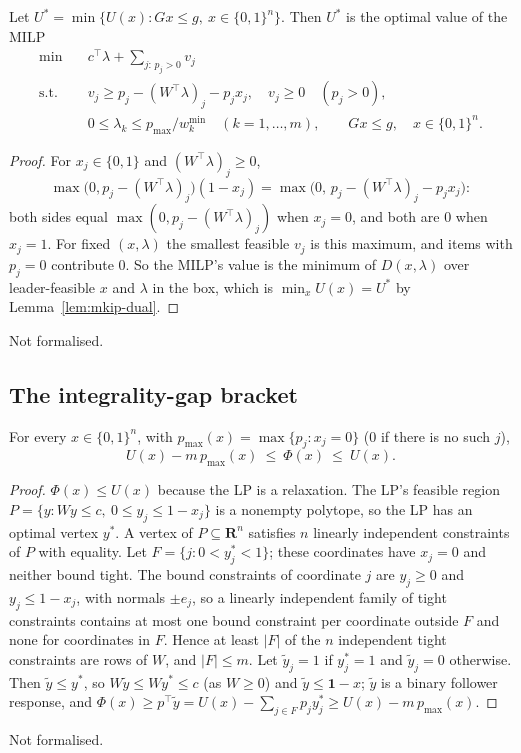 \begin{proposition}\label{prop:mkip-milp}
Let $U^{*}=\min\{U(x): Gx\le g,\ x\in\{0,1\}^n\}$. Then $U^{*}$ is the optimal
value of the MILP
\begin{align*}
  \min\quad & c^{\top}\lambda+\sum_{j:\,p_j>0}v_j\\
  \text{s.t.}\quad & v_j\ge p_j-(W^{\top}\lambda)_j-p_jx_j,\quad v_j\ge 0\quad (p_j>0),\\
  & 0\le\lambda_k\le p_{\max}/w^{\min}_k\quad (k=1,\dots,m),\qquad Gx\le g,\quad x\in\{0,1\}^n.
\end{align*}
\end{proposition}
\begin{proof}
For $x_j\in\{0,1\}$ and $(W^{\top}\lambda)_j\ge 0$,
\[
  \max\bigl(0,p_j-(W^{\top}\lambda)_j\bigr)(1-x_j)=\max\bigl(0,\,p_j-(W^{\top}\lambda)_j-p_jx_j\bigr):
\]
both sides equal $\max(0,p_j-(W^{\top}\lambda)_j)$ when $x_j=0$, and both are $0$
when $x_j=1$.
For fixed $(x,\lambda)$ the smallest feasible $v_j$ is this maximum, and items
with $p_j=0$ contribute $0$. So the MILP's value is the minimum of
$D(x,\lambda)$ over leader-feasible $x$ and $\lambda$ in the box, which is
$\min_xU(x)=U^{*}$ by Lemma~\ref{lem:mkip-dual}.
\end{proof}
\noindent Not formalised.

\subsection{The integrality-gap bracket}

\begin{lemma}\label{lem:mkip-gap}
For every $x\in\{0,1\}^n$, with $p_{\max}(x)=\max\{p_j: x_j=0\}$ ($0$ if there is
no such $j$),
\[
  U(x)-m\,p_{\max}(x)\ \le\ \Phi(x)\ \le\ U(x).
\]
\end{lemma}
\begin{proof}
$\Phi(x)\le U(x)$ because the LP is a relaxation. The LP's feasible region
$P=\{y: Wy\le c,\ 0\le y_j\le 1-x_j\}$ is a nonempty polytope, so the LP has
an optimal vertex $y^{*}$. A vertex of $P\subseteq\mathbf{R}^n$ satisfies $n$
linearly independent constraints of $P$ with equality. Let
$F=\{j: 0<y^{*}_j<1\}$; these coordinates have $x_j=0$ and neither bound
tight. The bound constraints of coordinate $j$ are $y_j\ge 0$ and
$y_j\le 1-x_j$, with normals $\pm e_j$, so a linearly independent family of
tight constraints contains at most one bound constraint per coordinate
outside $F$ and none for coordinates in $F$. Hence at least $|F|$ of the $n$
independent tight constraints are rows of $W$, and $|F|\le m$. Let
$\tilde y_j=1$ if $y^{*}_j=1$ and $\tilde y_j=0$ otherwise. Then
$\tilde y\le y^{*}$, so $W\tilde y\le Wy^{*}\le c$ (as $W\ge 0$) and
$\tilde y\le\mathbf{1}-x$; $\tilde y$ is a binary follower response, and
$\Phi(x)\ge p^{\top}\tilde y=U(x)-\sum_{j\in F}p_jy^{*}_j\ge U(x)-m\,p_{\max}(x)$.
\end{proof}
\noindent Not formalised.

